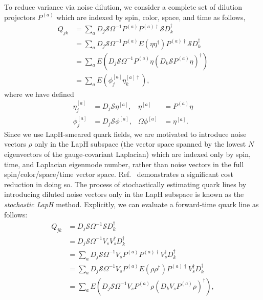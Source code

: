 To reduce variance via noise dilution, we consider a complete set of dilution projectors $P^{(a)}$ which are indexed by spin, color, space, and time as follows,
\begin{equation}
    \begin{aligned}
        Q_{j k} &=\sum_{a} D_{j} \mathcal{S} \Omega^{-1} P^{(a)} P^{(a) \dagger} \mathcal{S} D_{k}^{\dagger} \\
        &=\sum_{a} D_{j} \mathcal{S} \Omega^{-1} P^{(a)} E\left(\eta \eta^{\dagger}\right) P^{(a) \dagger} \mathcal{S} D_{k}^{\dagger} \\
        &=\sum_{a} E\left(D_{j} \mathcal{S} \Omega^{-1} P^{(a)} \eta\left(D_{k} \mathcal{S} P^{(a)} \eta\right)^{\dagger}\right)\\
        &=\sum_{a} E\left(\phi_{j}^{[a]} \eta_{k}^{[a] \dagger}\right),
    \end{aligned}
\end{equation}
where we have defined
\begin{equation}
    \begin{aligned}
        \eta_{j}^{[a]} &=D_{j} \mathcal{S} \eta^{[a]}, & \eta^{[a]} &=P^{(a)} \eta \\
        \phi_{j}^{[a]} &=D_{j} \mathcal{S} \phi^{[a]}, & \Omega \phi^{[a]} &=\eta^{[a]}.
    \end{aligned}
\end{equation}
Since we use LapH-smeared quark fields, we are motivated to introduce noise vectors $\rho$ only in the LapH subspace (the vector space spanned by the lowest $N$ eigenvectors of the gauge-covariant Laplacian) which are indexed only by spin, time, and Laplacian eigenmode number, rather than noise vectors in the full spin/color/space/time vector space. Ref.~\cite{Morningstar:2011ka} demonstrates a significant cost reduction in doing so. The process of stochastically estimating quark lines by introducing diluted noise vectors only in the LapH subspace is known as the \emph{stochastic LapH} method. Explicitly, we can evaluate a forward-time quark line as follows:
\begin{equation}
    \begin{aligned}
    Q_{j k} &=D_{j} \mathcal{S} \Omega^{-1} \mathcal{S} D_{k}^{\dagger} \\
    &=D_{j} \mathcal{S} \Omega^{-1} V_{s} V_{s}^{\dagger} D_{k}^{\dagger} \\
    &=\sum_{a} D_{j} \mathcal{S} \Omega^{-1} V_{s} P^{(a)} P^{(a) \dagger} V_{s}^{\dagger} D_{k}^{\dagger} \\
    &=\sum_{a} D_{j} \mathcal{S} \Omega^{-1} V_{s} P^{(a)} E\left(\rho \rho^{\dagger}\right) P^{(a) \dagger} V_{s}^{\dagger} D_{k}^{\dagger} \\
    &=\sum_{a} E\left(D_{j} \mathcal{S} \Omega^{-1} V_{s} P^{(a)} \rho\left(D_{k} V_{s} P^{(a)} \rho\right)^{\dagger}\right),
    \end{aligned}
\end{equation}
